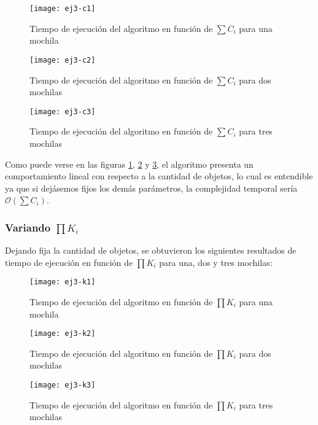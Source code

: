 \begin{figure}[H]
		\centering
		\texttt{[image: ej3-c1]}
		\caption{Tiempo de ejecución del algoritmo en función de $\sum C_i$ para una mochila}
		\label{fig:ej3-c1-fig}
	\end{figure}

\begin{figure}[H]
		\centering
		\texttt{[image: ej3-c2]}
		\caption{Tiempo de ejecución del algoritmo en función de $\sum C_i$ para dos mochilas}
		\label{fig:ej3-c2-fig}
	\end{figure}

\begin{figure}[H]
		\centering
		\texttt{[image: ej3-c3]}
		\caption{Tiempo de ejecución del algoritmo en función de $\sum C_i$ para tres mochilas}
		\label{fig:ej3-c3-fig}
	\end{figure}

Como puede verse en las figuras \ref{fig:ej3-c1-fig}, \ref{fig:ej3-c2-fig} y \ref{fig:ej3-c3-fig}, el algoritmo presenta un comportamiento lineal con respecto a la cantidad de objetos, lo cual es entendible ya que si dejásemos fijos los demás parámetros, la complejidad temporal sería $\mathcal{O}(\sum C_i)$. %

\subsubsection{Variando $\prod K_i$}

Dejando fija la cantidad de objetos, se obtuvieron los siguientes resultados de tiempo de ejecución en función de $\prod K_i$ para una, dos y tres mochilas:

\begin{figure}[H]
		\centering
		\texttt{[image: ej3-k1]}
		\caption{Tiempo de ejecución del algoritmo en función de $\prod K_i$ para una mochila}
		\label{fig:ej3-k1-fig}
	\end{figure}

\begin{figure}[H]
		\centering
		\texttt{[image: ej3-k2]}
		\caption{Tiempo de ejecución del algoritmo en función de $\prod K_i$ para dos mochilas}
		\label{fig:ej3-k2-fig}
	\end{figure}

\begin{figure}[H]
		\centering
		\texttt{[image: ej3-k3]}
		\caption{Tiempo de ejecución del algoritmo en función de $\prod K_i$ para tres mochilas}
		\label{fig:ej3-k3-fig}
	\end{figure}	

